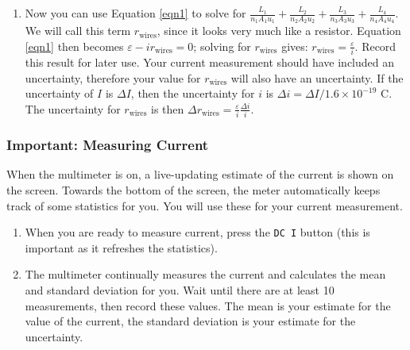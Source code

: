 \documentclass[12pt]{article}
\begin{document}
\begin{enumerate}
			\item Now you can use Equation \ref{eqn1} to solve for $\frac{L_1}{n_1A_1u_1}+\frac{L_2}{n_2A_2u_2}+\frac{L_3}{n_3A_3u_3}+\frac{L_4}{n_4A_4u_4}$. We will call this term $r_\mathrm{wires}$, since it looks very much like a resistor. Equation \ref{eqn1} then becomes $\varepsilon-ir_\mathrm{wires}=0$; solving for $r_\mathrm{wires}$ gives: $r_\mathrm{wires}=\frac{\varepsilon}{i}$. Record this result for later use. Your current measurement should have included an uncertainty, therefore your value for $r_\mathrm{wires}$ will also have an uncertainty. If the uncertainty of $I$ is $\Delta I$, then the uncertainty for $i$ is $\Delta i=\Delta I / 1.6\times10^{-19}$ C. The uncertainty for $r_\mathrm{wires}$ is then $\Delta r_\mathrm{wires}=\frac{\varepsilon}{i}\frac{\Delta i}{i}$.
		\end{enumerate}
	
		\subsubsection*{Important: Measuring Current}
		When the multimeter is on, a live-updating estimate of the current is shown on the screen. Towards the bottom of the screen, the meter automatically keeps track of some statistics for you. You will use these for your current measurement.
		\begin{enumerate}
			\item When you are ready to measure current, press the \texttt{DC I} button (this is important as it refreshes the statistics). 
			\item The multimeter continually measures the current and calculates the mean and standard deviation for you. Wait until there are at least 10 measurements, then record these values. The mean is your estimate for the value of the current, the standard deviation is your estimate for the uncertainty.
		\end{enumerate}
	
\end{document}
